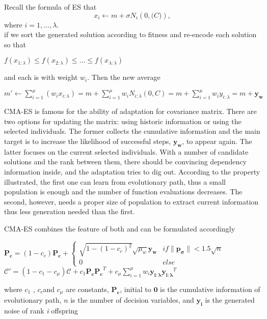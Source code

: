   Recall the formula of ES that \[ x_i \leftarrow m + \sigma
  N_i\left(0,\mathcal(C)\right),\] where $i = 1,\ldots,\lambda.$\\ if we
  sort the generated solution according to fitness and re-encode each
  solution so that \begin{center} $f(x_{1:\lambda}) \leq
    f(x_{2:\lambda}) \leq \ldots \leq f(x_{\lambda:\lambda})$
  \end{center} and each is with weight $w_i$. Then the new average
  \begin{center} $m' \leftarrow \sum\limits_{i=1}^{\mu} \left(w_i
    x_{i:\lambda}\right) = m + \sum\limits_{i=1}^{\mu}w_i
    N_{i:\lambda}(0,C) = m + \sum\limits_{i=1}^{\mu}w_i y_{i:\lambda} =
    m + \mathbf{y_w}$ \end{center} CMA-ES is famous for the ability of
  adaptation for covariance matrix.  There are two options for updating
  the matrix: using historic information or using the selected
  individuals.  The former collects the cumulative information and the
  main target is to increase the likelihood of successful steps,
  $\mathbf{y_w}$, to appear again.  The latter focuses on the current
  selected individuals.  With a number of candidate solutions and the
  rank between them, there should be convincing dependency information
  inside, and the adaptation tries to dig out.  According to the
  property illustrated, the first one can learn from evolutionary path,
  thus a small population is enough and the number of function
  evaluations decreases.  The second, however, needs a proper size of
  population to extract current information  thus less generation needed
  than the first.

      CMA-ES combines the feature of both and can be formulated
      accordingly \begin{center} $\mathbf{{P_c}} =
        (1-c_c)\mathbf{{P_c}}+\left\{ \begin{array}{cc}
          \sqrt{1-{\left(1-c_c\right)}^2}\sqrt{\mu_w}{\mathbf{y_w}} &
          if\|\mathbf{p_{\sigma}}\| < 1.5\sqrt{n}\\ 0 & else \end{array}
        \right.$\\ $\mathcal{C}' = (1-c_1-c_{\mu})\mathcal{C} +
        c_1{\mathbf{P_c}}{\mathbf{P_c}}^T +
        c_{\mu}\sum\limits_{i=1}^{\mu}
        w_i\mathbf{y_{i:\lambda}}\mathbf{y_{i:\lambda}}^T$ \end{center}
      where $c_1$ , $c_c$and $c_{\mu}$ are constants, $\mathbf{P_c}$,
      initial to $\mathbf{0}$ is the cumulative information of
      evolutionary path, $n$ is the number of decision variables, and
      $\mathbf{y_i}$ is the generated noise of rank \textit{i} offspring


